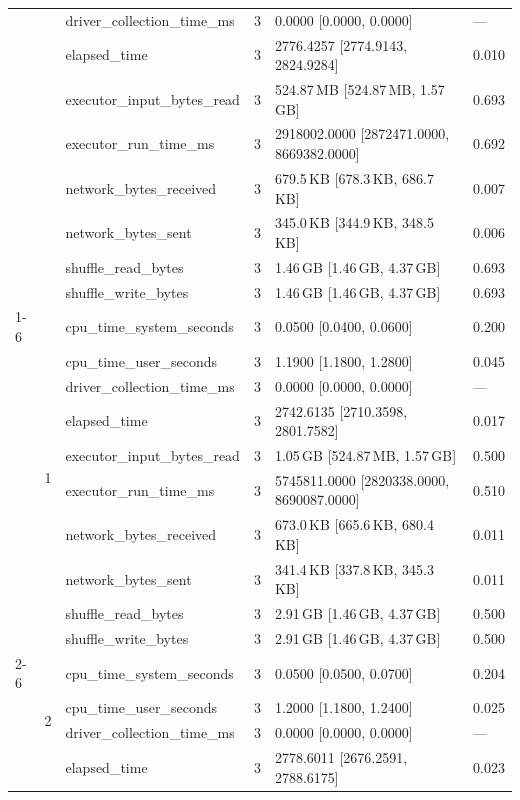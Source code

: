 \begin{tabular}{lllrll}
 &  & driver_collection_time_ms & 3 & 0.0000 [0.0000, 0.0000] & --- \\
 &  & elapsed_time & 3 & 2776.4257 [2774.9143, 2824.9284] & 0.010 \\
 &  & executor_input_bytes_read & 3 & 524.87\,MB [524.87\,MB, 1.57\,GB] & 0.693 \\
 &  & executor_run_time_ms & 3 & 2918002.0000 [2872471.0000, 8669382.0000] & 0.692 \\
 &  & network_bytes_received & 3 & 679.5\,KB [678.3\,KB, 686.7\,KB] & 0.007 \\
 &  & network_bytes_sent & 3 & 345.0\,KB [344.9\,KB, 348.5\,KB] & 0.006 \\
 &  & shuffle_read_bytes & 3 & 1.46\,GB [1.46\,GB, 4.37\,GB] & 0.693 \\
 &  & shuffle_write_bytes & 3 & 1.46\,GB [1.46\,GB, 4.37\,GB] & 0.693 \\
\cline{1-6} \cline{2-6}
\multirow[t]{30}{*}{national-scale-spatial-join-databricks-partitioned-4-nodes-small} & \multirow[t]{10}{*}{1} & cpu_time_system_seconds & 3 & 0.0500 [0.0400, 0.0600] & 0.200 \\
 &  & cpu_time_user_seconds & 3 & 1.1900 [1.1800, 1.2800] & 0.045 \\
 &  & driver_collection_time_ms & 3 & 0.0000 [0.0000, 0.0000] & --- \\
 &  & elapsed_time & 3 & 2742.6135 [2710.3598, 2801.7582] & 0.017 \\
 &  & executor_input_bytes_read & 3 & 1.05\,GB [524.87\,MB, 1.57\,GB] & 0.500 \\
 &  & executor_run_time_ms & 3 & 5745811.0000 [2820338.0000, 8690087.0000] & 0.510 \\
 &  & network_bytes_received & 3 & 673.0\,KB [665.6\,KB, 680.4\,KB] & 0.011 \\
 &  & network_bytes_sent & 3 & 341.4\,KB [337.8\,KB, 345.3\,KB] & 0.011 \\
 &  & shuffle_read_bytes & 3 & 2.91\,GB [1.46\,GB, 4.37\,GB] & 0.500 \\
 &  & shuffle_write_bytes & 3 & 2.91\,GB [1.46\,GB, 4.37\,GB] & 0.500 \\
\cline{2-6}
 & \multirow[t]{10}{*}{2} & cpu_time_system_seconds & 3 & 0.0500 [0.0500, 0.0700] & 0.204 \\
 &  & cpu_time_user_seconds & 3 & 1.2000 [1.1800, 1.2400] & 0.025 \\
 &  & driver_collection_time_ms & 3 & 0.0000 [0.0000, 0.0000] & --- \\
 &  & elapsed_time & 3 & 2778.6011 [2676.2591, 2788.6175] & 0.023 \\

\end{tabular}

